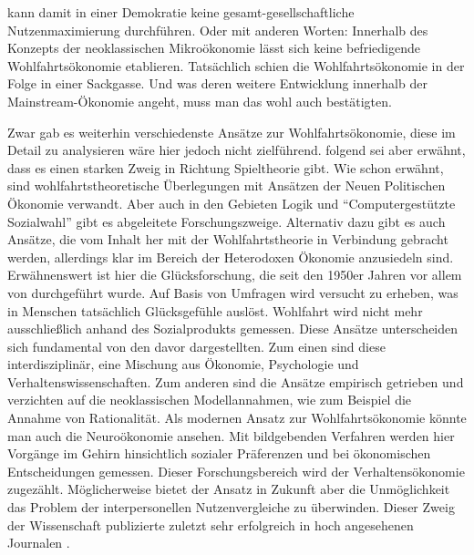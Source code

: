 kann damit in einer Demokratie keine gesamt-gesellschaftliche Nutzenmaximierung durchführen. Oder mit anderen Worten: Innerhalb des Konzepts der neoklassischen Mikroökonomie lässt sich keine befriedigende Wohlfahrtsökonomie etablieren. Tatsächlich schien die Wohlfahrtsökonomie in der Folge in einer Sackgasse. Und was deren weitere Entwicklung innerhalb der Mainstream-Ökonomie angeht, muss man das wohl auch bestätigten. 

Zwar gab es weiterhin verschiedenste Ansätze zur Wohlfahrtsökonomie, diese im Detail zu analysieren wäre hier jedoch nicht zielführend. \textcite{Fleurbaey2021} folgend sei aber erwähnt, dass es einen starken Zweig in Richtung Spieltheorie gibt. Wie schon erwähnt, sind wohlfahrtstheoretische Überlegungen mit Ansätzen der Neuen Politischen Ökonomie verwandt. Aber auch in den Gebieten Logik und "`Computergestützte Sozialwahl"' gibt es abgeleitete Forschungszweige. Alternativ dazu gibt es auch Ansätze, die vom Inhalt her mit der Wohlfahrtstheorie in Verbindung gebracht werden, allerdings klar im Bereich der Heterodoxen Ökonomie anzusiedeln sind. Erwähnenswert ist hier die Glücksforschung, die seit den 1950er Jahren vor allem von \textcite{Easterlin1974} durchgeführt wurde. Auf Basis von Umfragen wird versucht zu erheben, was in Menschen tatsächlich Glücksgefühle auslöst. Wohlfahrt wird nicht mehr ausschließlich anhand des Sozialprodukts gemessen. Diese Ansätze unterscheiden sich fundamental von den davor dargestellten. Zum einen sind diese interdisziplinär, eine Mischung aus Ökonomie, Psychologie und Verhaltenswissenschaften. Zum anderen sind die Ansätze empirisch getrieben und verzichten auf die neoklassischen Modellannahmen, wie zum Beispiel die Annahme von Rationalität. Als modernen Ansatz zur Wohlfahrtsökonomie könnte man auch die Neuroökonomie ansehen. Mit bildgebenden Verfahren werden hier Vorgänge im Gehirn hinsichtlich sozialer Präferenzen und bei ökonomischen Entscheidungen gemessen. Dieser Forschungsbereich wird der Verhaltensökonomie zugezählt. Möglicherweise bietet der Ansatz in Zukunft aber die Unmöglichkeit das Problem der interpersonellen Nutzenvergleiche zu überwinden. Dieser Zweig der Wissenschaft publizierte zuletzt sehr erfolgreich in hoch angesehenen Journalen \parencite{Fehr2000, Fehr2003}.

